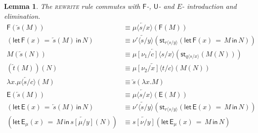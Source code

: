 \documentclass[10pt]{article}
\newtheorem{lemma}{Lemma}
\theoremstyle{definition}
\newcommand{\rewrite}[2]{\overleftarrow{#1}(#2)}
\newcommand\UE[2]{\ensuremath{#1(#2)}}
\newcommand\UI[2]{\ensuremath{\lambda #1.#2}}
\newcommand\StI[2]{\ensuremath{\mathsf{st}_{#1}(#2)}}
\newcommand\FE[3]{\ensuremath{\mathsf{let} \, \mathsf{F}(#2) \, = \, {#1} \, \mathsf{in} \, #3}}
\newcommand\FI[1]{\ensuremath{\mathsf{F}{(#1)}}}
\newcommand\EE[3]{\ensuremath{\mathsf{let} \, \mathsf{E}(#2) \, = \, {#1} \, \mathsf{in} \, #3}}
\newcommand\EEs[4]{\ensuremath{\mathsf{let} \, \mathsf{E}_{#1}(#3) \, = \, {#2} \, \mathsf{in} \, #4}}
\newcommand\EI[1]{\ensuremath{\mathsf{E}{(#1)}}}
\newcommand\ap[2]{\ensuremath{#1 \langle #2 \rangle }}
\begin{document}
\begin{lemma} \label{lem:rewrite-push}
The \textsc{rewrite} rule commutes with $\mathsf{F}$-, $\mathsf{U}$- and $E$- introduction and elimination.
\begin{align*}
\FI{\rewrite{s}{M}} &\equiv \rewrite{\ap{\mu}{s/x}}{\FI{M}} \\
(\FE{\rewrite{s}{M}}{x}{N}) &\equiv \rewrite{\ap{\nu'}{s/y}}{\StI{\ap{r}{s/y}}{\FE{M}{x}{N}}} \\
\UE{M}{\rewrite{s}{N}} &\equiv \rewrite{\ap{\mu[\nu_1/c]}{s/x}}{\StI{\ap{q}{s/x}}{\UE{M}{N}}} \\
\UE{(\rewrite{t}{M})}{N} &\equiv \rewrite{\ap{\mu[\nu_2/x]}{t/c}}{\UE{M}{N}} \\
\UI{x}{\rewrite{\ap{\mu}{s/c}}{M}}  &\equiv\rewrite{s}{\UI{x}{M}} \\
\EI{\rewrite{s}{M}} &\equiv \rewrite{\ap{\mu}{s/x}}{\EI{M}} \\
(\EE{\rewrite{s}{M}}{x}{N}) &\equiv \rewrite{\ap{\nu'}{s/y}}{\StI{\ap{r}{s/y}}{\EE{M}{x}{N}}} \\
(\EEs{\mu}{M}{x}{\rewrite{s[\mu/y]}{N}}) &\equiv \rewrite{s[\nu/y]}{\EEs{\mu}{M}{x}{N}} 
\end{align*}
\end{lemma}
\end{document}
